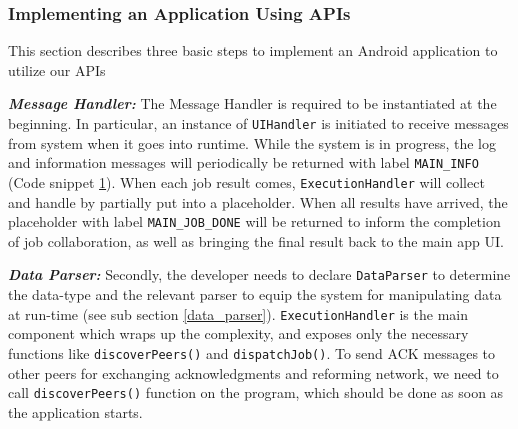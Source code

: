 \documentclass{sig-alternate}[10pt]
\begin{document}
\begin{CCSXML}
\subsubsection{Implementing an Application Using APIs}
This section describes three basic steps to implement an Android application to utilize our APIs

\textbf{\emph{Message Handler:}}
The Message Handler is required to be instantiated at the beginning. In particular, an instance of \texttt{UIHandler} is initiated to receive messages from system when it goes into runtime. While the system is in progress, the log and information messages will periodically be returned with label \texttt{MAIN\_INFO} (Code snippet \ref{ui_handler}). When each job result comes, \texttt{ExecutionHandler} will collect and handle by partially put into a placeholder. When all results have arrived, the placeholder with label \texttt{MAIN\_JOB\_DONE} will be returned to inform the completion of job collaboration, as well as bringing the final result back to the main app UI.

\begin{figure}
\noindent {}
\label{ui_handler}
\end{figure}

\textbf{\emph{Data Parser:}}
Secondly, the developer needs to declare \texttt{DataParser} to determine the data-type and the relevant parser to equip the system for manipulating data at run-time (see sub section \ref{data_parser}). \texttt{ExecutionHandler} is the main component which wraps up the complexity, and exposes only the necessary functions like \texttt{discoverPeers()} and \texttt{dispatchJob()}. To send ACK messages to other peers for exchanging acknowledgments and reforming network, we need to call \texttt{discoverPeers()} function on the program, which should be done as soon as the application starts.

\begin{figure}
\noindent {}	
  \label{code:get_single_part}


\end{figure}
\end{CCSXML}
\end{document}
